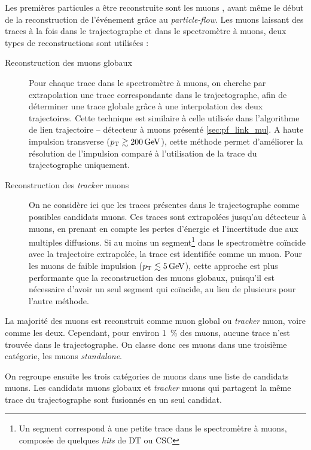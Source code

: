 Les premières particules a être reconstruite sont les muons \citep{cms_muons_reco}, avant même le début de la reconstruction de l'événement grâce au \emph{particle-flow}. Les muons laissant des traces à la fois dans le trajectographe et dans le spectromètre à muons, deux types de reconstructions sont utilisées :

\begin{description}
    \item[Reconstruction des muons globaux] Pour chaque trace dans le spectromètre à muons, on cherche par extrapolation une trace correspondante dans le trajectographe, afin de déterminer une trace globale grâce à une interpolation des deux trajectoires. Cette technique est similaire à celle utilisée dans l'algorithme de lien trajectoire -- détecteur à muons présenté \cref{sec:pf_link_mu}. A haute impulsion transverse ($\pt \gtrsim \SI{200}{\GeV}$), cette méthode permet d'améliorer la résolution de l'impulsion comparé à l'utilisation de la trace du trajectographe uniquement.
    \item[Reconstruction des \emph{tracker} muons] On ne considère ici que les traces présentes dans le trajectographe comme possibles candidats muons. Ces traces sont extrapolées jusqu'au détecteur à muons, en prenant en compte les pertes d'énergie et l'incertitude due aux multiples diffusions. Si au moins un segment\footnote{Un segment correspond à une petite trace dans le spectromètre à muons, composée de quelques \emph{hits} de DT ou CSC} dans le spectromètre coïncide avec la trajectoire extrapolée, la trace est identifiée comme un muon. Pour les muons de faible impulsion ($\pt \lesssim
 \SI{5}{\GeV}$), cette approche est plus performante que la reconstruction des muons globaux, puisqu'il est nécessaire d'avoir un seul segment qui coïncide, au lieu de plusieurs pour l'autre méthode.
\end{description}

La majorité des muons est reconstruit comme muon global ou \emph{tracker} muon, voire comme les deux. Cependant, pour environ \SI{1}{\%} des muons, aucune trace n'est trouvée dans le trajectographe. On classe donc ces muons dans une troisième catégorie, les muons \emph{standalone}.

\medskip

On regroupe ensuite les trois catégories de muons dans une liste de candidats muons. Les candidats muons globaux et \emph{tracker} muons qui partagent la même trace du trajectographe sont fusionnés en un seul candidat.

